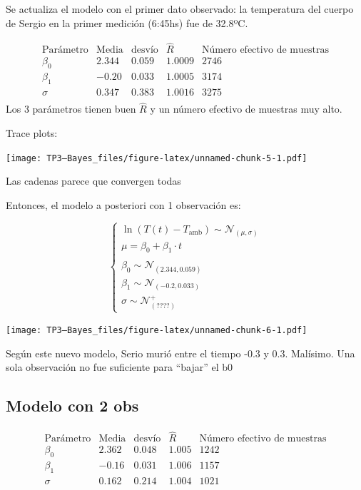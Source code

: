 \documentclass[
]{article}
\begin{document}
Se actualiza el modelo con el primer dato observado: la temperatura del
cuerpo de Sergio en la primer medición (6:45hs) fue de 32.8ºC.

\[
\begin{array}{c|cc|cc}
\text{Parámetro} &\text{Media} &\text{desvío} & \hat{R} & \text{Número efectivo de muestras} \\
\hline
\beta_0 & 2.344 & 0.059 & 1.0009 & 2746 \\
\beta_1 & -0.20 & 0.033 & 1.0005 & 3174 \\
\sigma & 0.347 & 0.383 & 1.0016 & 3275 \\
\end{array}
\] Los 3 parámetros tienen buen \(\hat{R}\) y un número efectivo de
muestras muy alto.

Trace plots:

\texttt{[image: TP3---Bayes\_files/figure-latex/unnamed-chunk-5-1.pdf]}

Las cadenas parece que convergen todas

Entonces, el modelo a posteriori con 1 observación es:

\[
\begin{cases}
\ln(T(t) - T_{\mathrm{amb}}) \sim\mathcal{N}_{(\mu, \sigma)} \\
\mu = \beta_{0} + \beta_{1}\cdot t \\
\\
\beta_0 \sim \mathcal{N}_{(2.344, 0.059)} \\
\beta_1 \sim \mathcal{N}_{(-0.2, 0.033)} \\
\sigma \sim \mathcal{N}^{+}_{(????)}
\end{cases}
\]

\texttt{[image: TP3---Bayes\_files/figure-latex/unnamed-chunk-6-1.pdf]}

Según este nuevo modelo, Serio murió entre el tiempo -0.3 y 0.3.
Malísimo. Una sola observación no fue suficiente para ``bajar'' el b0

\hypertarget{modelo-con-2-obs}{%
\subsection{Modelo con 2 obs}\label{modelo-con-2-obs}}

\[
\begin{array}{c|cc|cc}
\text{Parámetro} &\text{Media} &\text{desvío} & \hat{R} & \text{Número efectivo de muestras} \\
\hline
\beta_0 & 2.362 & 0.048 & 1.005 & 1242 \\
\beta_1 & -0.16 & 0.031 & 1.006 & 1157 \\
\sigma & 0.162 & 0.214 & 1.004 & 1021 \\
\end{array}
\]
\end{document}
